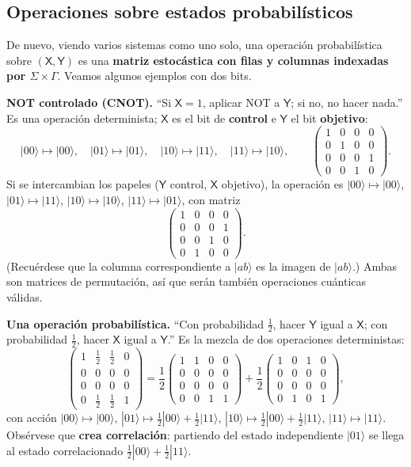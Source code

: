 \documentclass[11pt, a4paper, twoside, openright]{report}
\begin{document}
\subsection{Operaciones sobre estados probabilísticos}

\noindent De nuevo, viendo varios sistemas como uno solo, una operación probabilística sobre $(\mathsf{X},\mathsf{Y})$ es una \textbf{matriz estocástica con filas y columnas indexadas por $\Sigma\times\Gamma$}. Veamos algunos ejemplos con dos bits.

\noindent \textbf{NOT controlado (CNOT).} ``Si $\mathsf{X}=1$, aplicar NOT a $\mathsf{Y}$; si no, no hacer nada.'' Es una operación determinista; $\mathsf{X}$ es el bit de \textbf{control} e $\mathsf{Y}$ el bit \textbf{objetivo}:
\[
|00\rangle\mapsto|00\rangle,\quad |01\rangle\mapsto|01\rangle,\quad |10\rangle\mapsto|11\rangle,\quad |11\rangle\mapsto|10\rangle,
\qquad
\begin{pmatrix} 1&0&0&0\\0&1&0&0\\0&0&0&1\\0&0&1&0 \end{pmatrix}.
\]
Si se intercambian los papeles ($\mathsf{Y}$ control, $\mathsf{X}$ objetivo), la operación es $|00\rangle\mapsto|00\rangle$, $|01\rangle\mapsto|11\rangle$, $|10\rangle\mapsto|10\rangle$, $|11\rangle\mapsto|01\rangle$, con matriz
\[ \begin{pmatrix} 1&0&0&0\\0&0&0&1\\0&0&1&0\\0&1&0&0 \end{pmatrix}. \]
(Recuérdese que la columna correspondiente a $|ab\rangle$ es la imagen de $|ab\rangle$.) Ambas son matrices de permutación, así que serán también operaciones cuánticas válidas.

\noindent \textbf{Una operación probabilística.} ``Con probabilidad $\frac12$, hacer $\mathsf{Y}$ igual a $\mathsf{X}$; con probabilidad $\frac12$, hacer $\mathsf{X}$ igual a $\mathsf{Y}$.'' Es la mezcla de dos operaciones deterministas:
\[
\begin{pmatrix} 1&\frac12&\frac12&0\\0&0&0&0\\0&0&0&0\\0&\frac12&\frac12&1 \end{pmatrix}
= \frac12\begin{pmatrix} 1&1&0&0\\0&0&0&0\\0&0&0&0\\0&0&1&1 \end{pmatrix}
+ \frac12\begin{pmatrix} 1&0&1&0\\0&0&0&0\\0&0&0&0\\0&1&0&1 \end{pmatrix},
\]
con acción $|00\rangle\mapsto|00\rangle$, $|01\rangle\mapsto\frac12|00\rangle+\frac12|11\rangle$, $|10\rangle\mapsto\frac12|00\rangle+\frac12|11\rangle$, $|11\rangle\mapsto|11\rangle$. Obsérvese que \textbf{crea correlación}: partiendo del estado independiente $|01\rangle$ se llega al estado correlacionado $\frac12|00\rangle+\frac12|11\rangle$.
\end{document}
